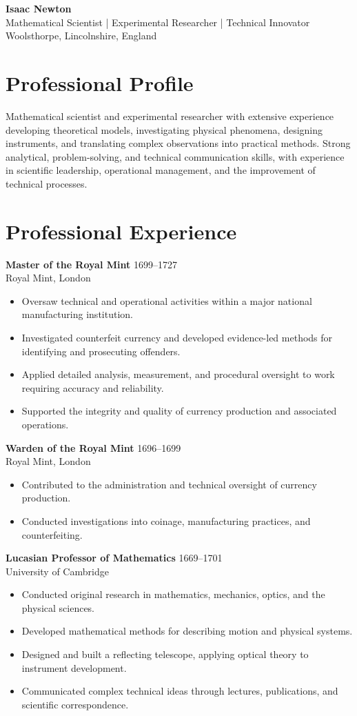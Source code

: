 \documentclass[11pt,a4paper]{article}
\begin{document}
\begin{center}
{\LARGE \textbf{Isaac Newton}}\\
Mathematical Scientist | Experimental Researcher | Technical Innovator\\
Woolsthorpe, Lincolnshire, England\\
\end{center}
\section*{Professional Profile}
Mathematical scientist and experimental researcher with extensive experience developing theoretical models, investigating physical phenomena, designing instruments, and translating complex observations into practical methods. Strong analytical, problem-solving, and technical communication skills, with experience in scientific leadership, operational management, and the improvement of technical processes.
\section*{Professional Experience}
\textbf{Master of the Royal Mint} \hfill 1699--1727\\
Royal Mint, London
\begin{itemize}
\item Oversaw technical and operational activities within a major national manufacturing institution.
\item Investigated counterfeit currency and developed evidence-led methods for identifying and prosecuting offenders.
\item Applied detailed analysis, measurement, and procedural oversight to work requiring accuracy and reliability.
\item Supported the integrity and quality of currency production and associated operations.
\end{itemize}
\textbf{Warden of the Royal Mint} \hfill 1696--1699\\
Royal Mint, London
\begin{itemize}
\item Contributed to the administration and technical oversight of currency production.
\item Conducted investigations into coinage, manufacturing practices, and counterfeiting.
\end{itemize}
\textbf{Lucasian Professor of Mathematics} \hfill 1669--1701\\
University of Cambridge
\begin{itemize}
\item Conducted original research in mathematics, mechanics, optics, and the physical sciences.
\item Developed mathematical methods for describing motion and physical systems.
\item Designed and built a reflecting telescope, applying optical theory to instrument development.
\item Communicated complex technical ideas through lectures, publications, and scientific correspondence.
\end{itemize}
\end{document}
